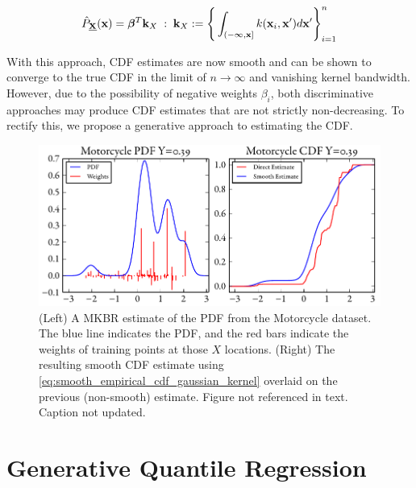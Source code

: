 \documentclass[twoside]{article} \usepackage{aistats2017}
\theoremstyle{definition}
\theoremstyle{remark}
\newcommand{\rv}[1]{\underline{#1}}
\newcommand{\ds}[1]{{#1}}
\newcommand{\warn}[1]{{\color{RedOrange} #1}}
\begin{document}
		\begin{equation}
			\hat{P}_{\bvec{\rv{X}}}(\bvec{x}) = \bm{\beta}^{T} \bvec{k}_{\ds{X}} \; : \; \bvec{k}_{\ds{X}} := \Bigg\{ \int_{(-\bvec{\infty}, \bvec{x}]}  k(\bvec{x}_{i}, \bvec{x}') d\bvec{x}' \Bigg\}_{i = 1}^{n}
		\label{eq:kernel_integral}
		\end{equation}
			
		With this approach, CDF estimates are now smooth and can be shown to converge to the true CDF in the limit of $n \rightarrow \infty$ and vanishing kernel bandwidth. However, due to the possibility of negative weights $\beta_{i}$, both discriminative approaches may produce CDF estimates that are not strictly non-decreasing. To rectify this, we propose a generative approach to estimating the CDF.

		\begin{figure}
			\begin{center}
				\includegraphics[width=\columnwidth]{figures/cumulativeexamplesmooth}
			\end{center}
			\caption{\small (Left) A MKBR estimate of the PDF from the Motorcycle dataset. The blue line indicates the PDF, and the red bars indicate the weights of training points at those $X$ locations. (Right) The resulting smooth CDF estimate using \eqref{eq:smooth_empirical_cdf_gaussian_kernel} overlaid on the previous (non-smooth) estimate. \warn{Figure not referenced in text. Caption not updated.}}
			\label{fig:cumulativeexamplesmooth}
		\end{figure}

\section{Generative Quantile Regression}
\label{sec:generative_quantile_regression}

	
\end{document}
